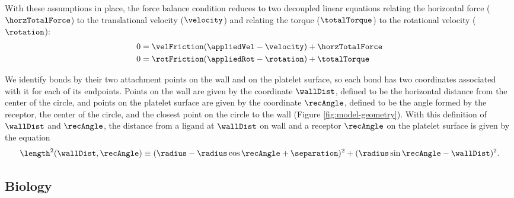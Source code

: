 With these assumptions in place, the force balance condition reduces
to two decoupled linear equations relating the horizontal force
($\horzTotalForce$) to the translational velocity ($\velocity$) and
relating the torque ($\totalTorque$) to the rotational velocity
($\rotation$):
\begin{align}
  \label{eq:force-bal}
  0 &= \velFriction(\appliedVel - \velocity) + \horzTotalForce \\
  \label{eq:torque-bal}
  0 &= \rotFriction(\appliedRot - \rotation) + \totalTorque
\end{align}

We identify bonds by their two attachment points on the wall and on
the platelet surface, so each bond has two coordinates associated with
it for each of its endpoints. Points on the wall are given by the
coordinate $\wallDist$, defined to be the horizontal distance from the
center of the circle, and points on the platelet surface are given by
the coordinate $\recAngle$, defined to be the angle formed by the
receptor, the center of the circle, and the closest point on the
circle to the wall (Figure \ref{fig:model-geometry}). With this
definition of $\wallDist$ and $\recAngle$, the distance from a ligand at
$\wallDist$ on wall and a receptor $\recAngle$ on the platelet surface is
given by the equation
\begin{equation}
  \label{eq:dim-length}
  \length^2 (\wallDist, \recAngle) \equiv (\radius - \radius\cos\recAngle +
  \separation)^2 + (\radius\sin\recAngle - \wallDist)^2.
\end{equation}

\subsection{Biology}
\label{sec:biology}

